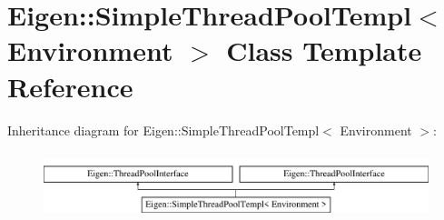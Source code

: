 \hypertarget{class_eigen_1_1_simple_thread_pool_templ}{}\section{Eigen\+:\+:Simple\+Thread\+Pool\+Templ$<$ Environment $>$ Class Template Reference}
\label{class_eigen_1_1_simple_thread_pool_templ}
Inheritance diagram for Eigen\+:\+:Simple\+Thread\+Pool\+Templ$<$ Environment $>$\+:\begin{figure}[H]
\begin{center}
\leavevmode
\includegraphics[height=1.951219cm]{class_eigen_1_1_simple_thread_pool_templ}
\end{center}
\end{figure}
